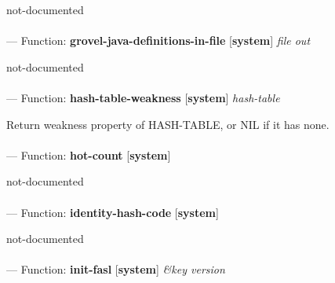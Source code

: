 \begin{adjustwidth}{5em}{5em}
not-documented
\end{adjustwidth}

\paragraph{}
\label{SYSTEM:GROVEL-JAVA-DEFINITIONS-IN-FILE}
--- Function: \textbf{grovel-java-definitions-in-file} [\textbf{system}] \textit{file out}

\begin{adjustwidth}{5em}{5em}
not-documented
\end{adjustwidth}

\paragraph{}
\label{SYSTEM:HASH-TABLE-WEAKNESS}
--- Function: \textbf{hash-table-weakness} [\textbf{system}] \textit{hash-table}

\begin{adjustwidth}{5em}{5em}
Return weakness property of HASH-TABLE, or NIL if it has none.
\end{adjustwidth}

\paragraph{}
\label{SYSTEM:HOT-COUNT}
--- Function: \textbf{hot-count} [\textbf{system}] \textit{}

\begin{adjustwidth}{5em}{5em}
not-documented
\end{adjustwidth}

\paragraph{}
\label{SYSTEM:IDENTITY-HASH-CODE}
--- Function: \textbf{identity-hash-code} [\textbf{system}] \textit{}

\begin{adjustwidth}{5em}{5em}
not-documented
\end{adjustwidth}

\paragraph{}
\label{SYSTEM:INIT-FASL}
--- Function: \textbf{init-fasl} [\textbf{system}] \textit{\&key version}

